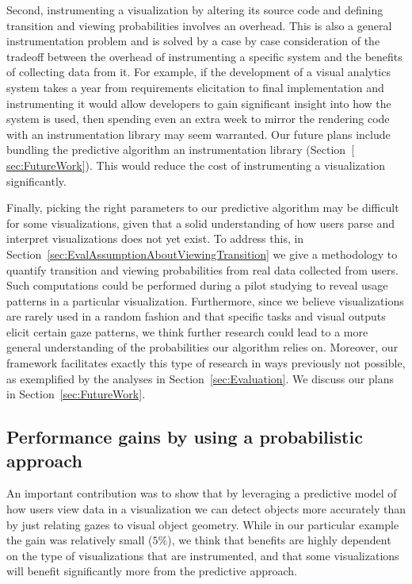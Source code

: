 Second, instrumenting a visualization by altering its source code and defining transition and viewing probabilities involves an overhead. This is also a general instrumentation problem and is solved by a case by case consideration of the tradeoff between the overhead of instrumenting a specific system and the benefits of collecting data from it. For example, if the development of a visual analytics system takes a year from requirements elicitation to final implementation and instrumenting it would allow developers to gain significant insight into how the system is used, then spending even an extra week to mirror the rendering code with an instrumentation library may seem warranted.  Our future plans include bundling the predictive algorithm an instrumentation library (Section~\ref{ sec:FutureWork}). This would reduce the cost of instrumenting a visualization significantly. 



Finally, picking the right parameters to our predictive algorithm may be difficult for some visualizations, given that a solid understanding of how users parse and interpret visualizations does not yet exist. To address this, in Section~\ref{sec:EvalAssumptionAboutViewingTransition}  we give a methodology to quantify transition and viewing probabilities from real data collected from users. Such computations could be performed during a pilot studying to reveal usage patterns in a particular visualization. Furthermore, since we believe visualizations are rarely used in a random fashion and that specific tasks and visual outputs elicit certain gaze patterns, we think further research could lead to a more general understanding of the probabilities our algorithm relies on.  Moreover, our framework facilitates exactly this type of research in ways previously not possible, as exemplified by the analyses in Section~\ref{sec:Evaluation}. We discuss our plans in Section~\ref{sec:FutureWork}. 
 

\subsection{Performance gains by using a probabilistic approach}
An important contribution was to show that by leveraging a predictive model of how users view data in a visualization we can detect objects more accurately than by just relating gazes to visual object geometry. While in our particular example the gain was relatively small ($5\%$), we think that benefits are highly dependent on the type of visualizations that are instrumented, and that some visualizations will benefit significantly more from the predictive approach. 

